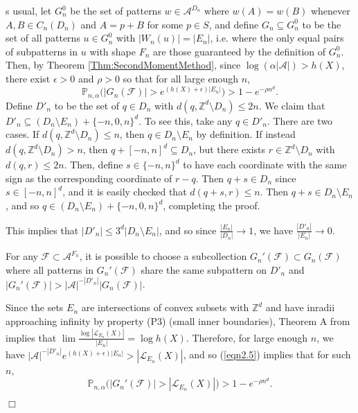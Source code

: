 \documentclass[12pt]{amsart}
\theoremstyle{definition}
\newenvironment{ProofOfEmbeddingThm}[1]
{\par\vskip2\parsep\noindent{\sc Proof of Theorem\ \ref{Thm:Embeddings}. }}{{\hfill
$\Box$}
\par\vskip2\parsep}
\begin{document}
\begin{ProofOfEmbeddingThm}
As usual, let $G^0_n$ be the set of patterns $w \in \mathcal{A}^{D_n}$ where $w(A) = w(B)$ whenever $A, B \in C_n(D_n)$ and $A = p + B$ for some $p \in S$, and define $G_n \subseteq G^0_n$ to be the set of all patterns $u \in G^0_n$ with $|W_n(u)| = |E_n|$, i.e. where the only equal pairs of subpatterns in $u$ with shape $F_n$ are those guaranteed by the definition of $G^0_n$. Then, by Theorem \ref{Thm:SecondMomentMethod}, since $\log(\alpha |\mathcal{A}|) > h(X)$, there exist $\epsilon > 0$ and $\rho>0$ so that for all large enough $n$, 
\begin{equation}\label{eqn2.5}
\mathbb{P}_{n,\alpha} \bigl(|G_n(\mathcal{F})| > e^{(h(X) + \epsilon)|E_n|} \bigr) > 1 - e^{- \rho n^d}.
\end{equation}
Define $D'_n$ to be the set of $q \in D_n$ with $d(q, \mathbb{Z}^d \setminus D_n) \leq 2n$. We claim that $D'_n \subseteq (D_n \setminus E_n) + \{-n,0,n\}^d$. To see this, take any $q \in D'_n$. There are two cases. If $d(q, \mathbb{Z}^d \setminus D_n) \leq n$, then $q \in D_n \setminus E_n$ by definition. If instead $d(q, \mathbb{Z}^d \setminus D_n) > n$, then $q + [-n,n]^d \subseteq D_n$, but there exists $r \in \mathbb{Z}^d \setminus D_n$ with $d(q,r) \leq 2n$. Then, define $s \in 
\{-n,n\}^d$ to have each coordinate with the same sign as the corresponding coordinate of $r - q$. Then $q + s \in D_n$ since $s \in [-n,n]^d$, and it is easily checked that $d(q+s, r) \leq n$. Then $q + s \in D_n \setminus E_n$, and so $q \in (D_n \setminus E_n) + \{-n,0,n\}^d$, completing the proof.

This implies that $|D'_n| \leq 3^d |D_n \setminus E_n|$, and so since $\frac{|E_n|}{|D_n|} \rightarrow 1$, we have $\frac{|D'_n|}{|E_n|} \rightarrow 0$. 

For any $\mathcal{F} \subset \mathcal{A}^{F_n}$, it is possible to choose a subcollection $G_n'(\mathcal{F}) \subset G_n(\mathcal{F})$ where all patterns in $G_n'(\mathcal{F})$ share the same subpattern on $D'_n$ and $|G_n'(\mathcal{F})| > |\mathcal{A}|^{-|D'_n|} |G_n(\mathcal{F})|$. 

Since the sets $E_n$ are intersections of convex subsets with $\mathbb{Z}^d$ and have inradii approaching infinity by property (P3) (small inner boundaries), Theorem A from \cite{BBQ} implies that $\lim \frac{\log |\mathcal{L}_{E_n}(X)|}{|E_n|} = \log h(X)$. Therefore, for large enough $n$, we have $|\mathcal{A}|^{-|D'_n|} e^{(h(X) + \epsilon) |E_n|} > |\mathcal{L}_{E_n}(X)|$, and so (\ref{eqn2.5}) implies that for such $n$, 
\begin{equation}\label{eqn3}
\mathbb{P}_{n,\alpha} \bigl(|G_n'(\mathcal{F})| > |\mathcal{L}_{E_n}(X)| \bigr) > 1 - e^{-\rho n^d}.
\end{equation}


\end{ProofOfEmbeddingThm}
\end{document}

